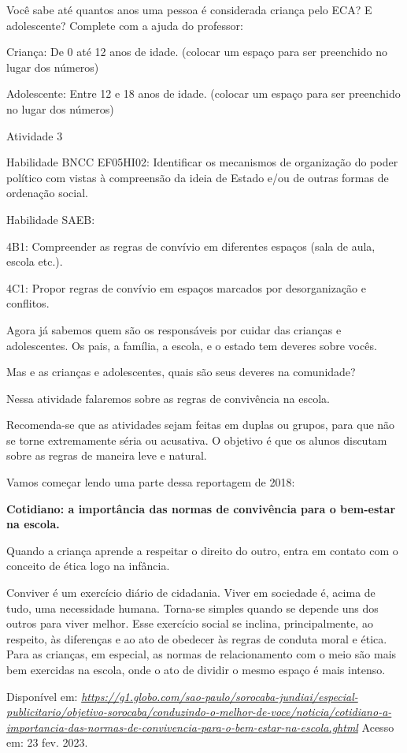 Você sabe até quantos anos uma pessoa é considerada criança pelo ECA? E
adolescente? Complete com a ajuda do professor:

Criança: De 0 até 12 anos de idade. (colocar um espaço para ser
preenchido no lugar dos números)

Adolescente: Entre 12 e 18 anos de idade. (colocar um espaço para ser
preenchido no lugar dos números)

Atividade 3

Habilidade BNCC EF05HI02: Identificar os mecanismos de organização do
poder político com vistas à compreensão da ideia de Estado e/ou de
outras formas de ordenação social.

Habilidade SAEB:

4B1: Compreender as regras de convívio em diferentes espaços (sala de
aula, escola etc.).

4C1: Propor regras de convívio em espaços marcados por desorganização e
conflitos.

Agora já sabemos quem são os responsáveis por cuidar das crianças e
adolescentes. Os pais, a família, a escola, e o estado tem deveres sobre
vocês.

Mas e as crianças e adolescentes, quais são seus deveres na comunidade?

Nessa atividade falaremos sobre as regras de convivência na escola.

Recomenda-se que as atividades sejam feitas em duplas ou grupos, para
que não se torne extremamente séria ou acusativa. O objetivo é que os
alunos discutam sobre as regras de maneira leve e natural.

Vamos começar lendo uma parte dessa reportagem de 2018:

\textbf{Cotidiano: a importância das normas de convivência para o
bem-estar na escola. }

Quando a criança aprende a respeitar o direito do outro, entra em
contato com o conceito de ética logo na infância.

Conviver é um exercício diário de cidadania. Viver em sociedade é, acima
de tudo, uma necessidade humana. Torna-se simples quando se depende uns
dos outros para viver melhor. Esse exercício social se inclina,
principalmente, ao respeito, às diferenças e ao ato de obedecer às
regras de conduta moral e ética. Para as crianças, em especial, as
normas de relacionamento com o meio são mais bem exercidas na escola,
onde o ato de dividir o mesmo espaço é mais intenso.

Disponível em:
\href{https://g1.globo.com/sao-paulo/sorocaba-jundiai/especial-publicitario/objetivo-sorocaba/conduzindo-o-melhor-de-voce/noticia/cotidiano-a-importancia-das-normas-de-convivencia-para-o-bem-estar-na-escola.ghtml}{\emph{https://g1.globo.com/sao-paulo/sorocaba-jundiai/especial-publicitario/objetivo-sorocaba/conduzindo-o-melhor-de-voce/noticia/cotidiano-a-importancia-das-normas-de-convivencia-para-o-bem-estar-na-escola.ghtml}}
Acesso em: 23 fev. 2023.

